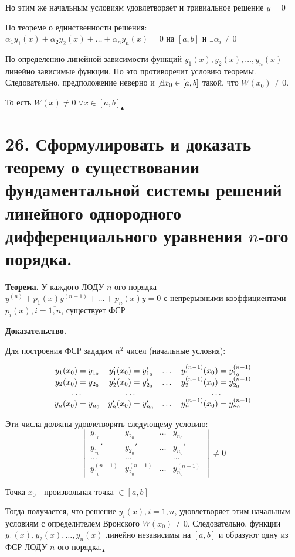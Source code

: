 \documentclass[11pt]{article}
\begin{document}
\par Но этим же начальным условиям удовлетворяет и тривиальное решение $y = 0$
\par По теореме о единственности решения: $\alpha_{1}y_{1}(x) + \alpha_{2}y_{2}(x) + \dots + \alpha_{n}y_{n}(x) = 0$ на $[a, b]$ и $\exists\alpha_{i} \neq 0$
\par По определению линейной зависимости функций $y_{1}(x), y_{2}(x), \dots, y_{n}(x)$ - линейно зависимые функции. Но это противоречит условию теоремы. Следовательно, предположение неверно и $\not\exists x_{0} \in [a, b]$ такой, что $W(x_{0}) \neq 0$.
\par То есть $W(x) \neq 0 \; \forall x \in [a, b] _{\blacktriangle}$

\section*{26. Сформулировать и доказать теорему о существовании фундаментальной системы решений линейного однородного дифференциального уравнения $n$-ого порядка.}
\par\textbf{Теорема.} У каждого ЛОДУ $n$-ого порядка $y^{(n)} + p_{1}(x)y^{(n-1)} + \dots + p_{n}(x)y = 0$ с непрерывными коэффициентами $p_{i}(x), i = \overline{1, n}$, существует ФСР
\par\textbf{Доказательство.}
\par Для построения ФСР зададим $n^2$ чисел (начальные условия):
\par \[\begin{array}{c c c c}
y_{1}(x_{0}) = y_{1_{0}} & y_{1}'(x_{0}) = y_{1_{0}}' & \dots & y_{1}^{(n-1)}(x_{0}) = y_{1_{0}}^{(n-1)} \\
y_{2}(x_{0}) = y_{2_{0}} & y_{2}'(x_{0}) = y_{2_{0}}' & \dots & y_{2}^{(n-1)}(x_{0}) = y_{2_{0}}^{(n-1)} \\
\dots & \dots & & \dots \\
y_{n}(x_{0}) = y_{n_{0}} & y_{n}'(x_{0}) = y_{n_{0}}' & \dots & y_{n}^{(n-1)}(x_{0}) = y_{n_{0}}^{(n-1)} 
\end{array}\]
\par Эти числа должны удовлетворять следующему условию:$$\begin{vmatrix}{}
y_{1_{0}} & y_{2_{0}} & \dots & y_{n_{0}} \\
y_{1_{0}}' & y_{2_{0}}' & \dots & y_{n_{0}}' \\
\dots & \dots & & \dots \\
y_{1_{0}}^{(n-1)} & y_{2_{0}}^{(n-1)} & \dots & y_{n_{0}}^{(n-1)}
\end{vmatrix} \neq 0$$
\par Точка $x_{0}$ - произвольная точка $\in [a, b]$
\par Тогда получается, что решение $y_{i}(x), i = \overline{1, n}$, удовлетворяет этим начальным условиям с определителем Вронского $W(x_{0}) \neq 0$. Следовательно, функции $y_{1}(x), y_{2}(x), \dots, y_{n}(x)$ линейно независимы на $[a, b]$ и образуют одну из ФСР ЛОДУ $n$-ого порядка.$_{\blacktriangle}$
\end{document}
